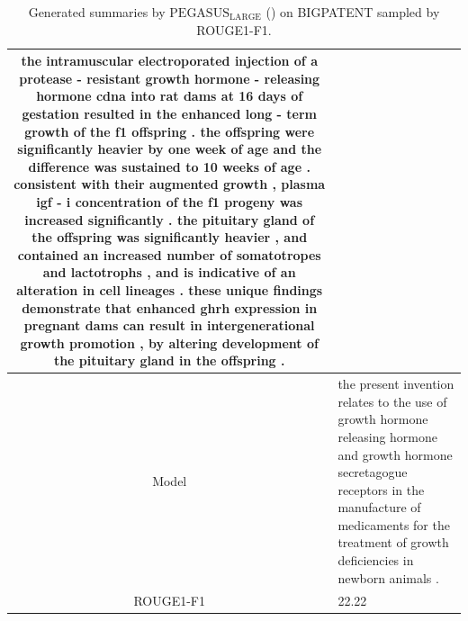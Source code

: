 \begin{table}[bth!]
\begin{tabular}{c|p{}}
the intramuscular electroporated injection of a protease - resistant growth hormone - releasing hormone cdna into rat dams at 16 days of gestation resulted in the enhanced long - term growth of the f1 offspring . the offspring were significantly heavier by one week of age and the difference was sustained to 10 weeks of age . consistent with their augmented growth , plasma igf - i concentration of the f1 progeny was increased significantly . the pituitary gland of the offspring was significantly heavier , and contained an increased number of somatotropes and lactotrophs , and is indicative of an alteration in cell lineages . these unique findings demonstrate that enhanced ghrh expression in pregnant dams can result in intergenerational growth promotion , by altering development of the pituitary gland in the offspring .
\\ \hline
Model & 
the present invention relates to the use of growth hormone releasing hormone and growth hormone secretagogue receptors in the manufacture of medicaments for the treatment of growth deficiencies in newborn animals .
\\ \hline
ROUGE1-F1 & 
22.22
\\ \hline
\end{tabular}
\caption{Generated summaries by $\text{PEGASUS}_{\text{LARGE}}$ (\gnews) on BIGPATENT sampled by ROUGE1-F1.}
\end{table}